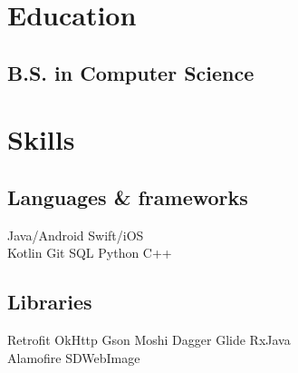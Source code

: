 \documentclass[]{Resume}
\begin{document}
%
%
\lastupdated

%
%

%
%

\begin{minipage}[t]{0.33\textwidth} 


\section{Education} 

\subsection{B.S. in Computer Science}
\sectionsep

\section{Skills}
\subsection{Languages \& frameworks}
Java/Android \textbullet{}   Swift/iOS \\
Kotlin \textbullet{} Git \textbullet{} SQL \textbullet{} Python \textbullet{} C++ \\
\sectionsep

\subsection{Libraries}
Retrofit \textbullet{} OkHttp \textbullet{} Gson \textbullet{} Moshi  \textbullet{} 
Dagger \textbullet{} Glide \textbullet{} RxJava \\
Alamofire \textbullet{} SDWebImage
\sectionsep


\end{minipage}
\end{document}
